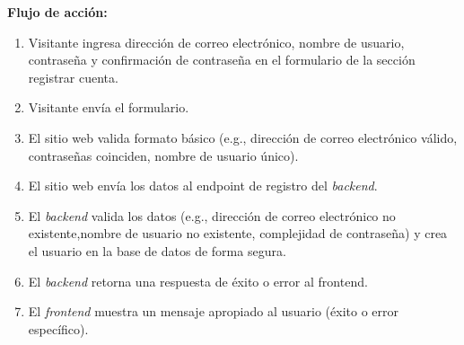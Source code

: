 \begin{addendum}
\begin{userstory}[hu:01]
{			\textbf{Flujo de acción:}
			\begin{enumerate}
				\item Visitante ingresa dirección de correo electrónico, nombre de usuario, contraseña y confirmación de contraseña en el formulario de la sección registrar cuenta.
				\item Visitante envía el formulario.
				\item El sitio web valida formato básico (e.g., dirección de correo electrónico válido, contraseñas coinciden, nombre de usuario único).
				\item El sitio web envía los datos al endpoint de registro del \textit{backend}.
				\item El \textit{backend} valida los datos (e.g., dirección de correo electrónico no existente,nombre de usuario no existente, complejidad de contraseña) y crea el usuario en la base de datos de forma segura.
				\item El \textit{backend} retorna una respuesta de éxito o error al frontend.
				\item El \textit{frontend} muestra un mensaje apropiado al usuario (éxito o error específico).
			\end{enumerate}
		}
		

\end{userstory}
\end{addendum}
